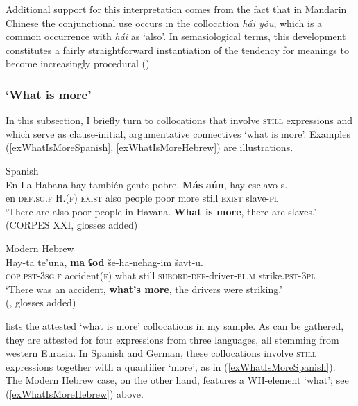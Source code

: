 {Additional support for this interpretation comes from the fact that in Mandarin Chinese the conjunctional use occurs in the collocation \textit{hái yǒu}, which is a common occurrence with \textit{hái} as \lq{}also\rq{}. In semasiological terms, this development constitutes a fairly straightforward instantiation of the tendency for meanings to become increasingly procedural ().

\subsubsection{\lq What is more\rq{}}\label{sectionWhatIsMore}
 In this subsection, I briefly turn to collocations that involve \textsc{still} expressions and which serve as clause-initial, argumentative connectives \lq what is more\rq{}. Examples (\ref{exWhatIsMoreSpanish}, \ref{exWhatIsMoreHebrew}) are illustrations.

\begin{exe}
	\ex Spanish\label{exWhatIsMoreSpanish}\\
	\gll En La Habana hay también gente pobre. \textbf{Más} \textbf{aún}, hay esclavo-s.\\
		en \textsc{def}.\textsc{sg}.\textsc{f} H.(\textsc{f}) \textsc{exist} also people poor more still \textsc{exist} slave-\textsc{pl}\\
	\glt \lq There are also poor people in Havana. \textbf{What is more}, there are slaves.' (CORPES XXI, glosses added)
 
	\ex Modern Hebrew\label{exWhatIsMoreHebrew}\\
	\gll Hay-ta te\rq{}una, \textbf{ma} \textbf{ʕod} še-ha-nehag-im šavt-u.\\
	\textsc{cop}.\textsc{pst}-3\textsc{sg}.\textsc{f} accident(\textsc{f}) what still \textsc{subord}-\textsc{def}-driver-\textsc{pl}.\textsc{m} strike.\textsc{pst}-3\textsc{pl}\\
	\glt \lq There was an accident, \textbf{what's more}, the drivers were striking.'
	\\(\cite[267]{Glinert1989}, glosses added)	
\end{exe}

 lists the attested \lq what is more\rq{ }collocations in my sample. As can be gathered, they are attested for four expressions from three languages, all stemming from western Eurasia. In Spanish and German, these collocations involve \textsc{still} expressions together with a quantifier \lq more\rq{}, as in (\ref{exWhatIsMoreSpanish}). The Modern Hebrew case, on the other hand, features a WH-element \lq what\rq{}; see (\ref{exWhatIsMoreHebrew}) above.

}
